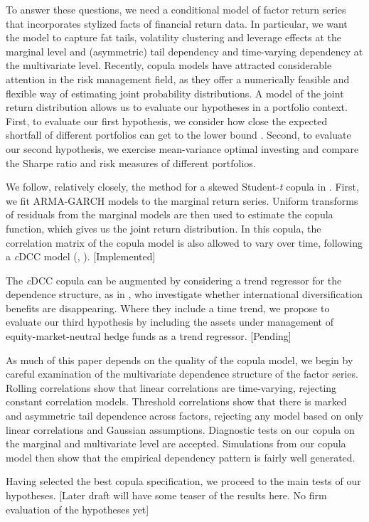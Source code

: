To answer these questions, we need a conditional model of factor return series that incorporates stylized facts of financial return data. In particular, we want the model to capture fat tails, volatility clustering and leverage effects at the marginal level and (asymmetric) tail dependency and time-varying dependency at the multivariate level. Recently, copula models have attracted considerable attention in the risk management field, as they offer a numerically feasible and flexible way of estimating joint probability distributions. A model of the joint return distribution allows us to evaluate our hypotheses in a portfolio context. First, to evaluate our first hypothesis, we consider how close the expected shortfall of different portfolios can get to the lower bound \autocite{ChristoffersenErrunzaJacobLanglois2012}. Second, to evaluate our second hypothesis, we exercise mean-variance optimal investing and compare the Sharpe ratio and risk measures of different portfolios.

We follow, relatively closely, the method for a skewed Student-\textit{t} copula in \textcite{ChristoffersenLanglois2013}. First, we fit ARMA-GARCH models to the marginal return series. Uniform transforms of residuals from the marginal models are then used to estimate the copula function, which gives us the joint return distribution. In this copula, the correlation matrix of the copula model is also allowed to vary over time, following a \textit{c}DCC model (\textcite{Engle2002}, \textcite{Aielli2013}). [Implemented]

The \textit{c}DCC copula can be augmented by considering a trend regressor for the dependence structure, as in \textcite{ChristoffersenErrunzaJacobLanglois2012}, who investigate whether international diversification benefits are disappearing. Where they include a time trend, we propose to evaluate our third hypothesis by including the assets under management of equity-market-neutral hedge funds as a trend regressor. [Pending]

As much of this paper depends on the quality of the copula model, we begin by careful examination of the multivariate dependence structure of the factor series. Rolling correlations show that linear correlations are time-varying, rejecting constant correlation models. Threshold correlations show that there is marked and asymmetric tail dependence across factors, rejecting any model based on only linear correlations and Gaussian assumptions. Diagnostic tests on our copula on the marginal and multivariate level are accepted. Simulations from our copula model then show that the empirical dependency pattern is fairly well generated. 

Having selected the best copula specification, we proceed to the main tests of our hypotheses. [Later draft will have some teaser of the results here. No firm evaluation of the hypotheses yet]
